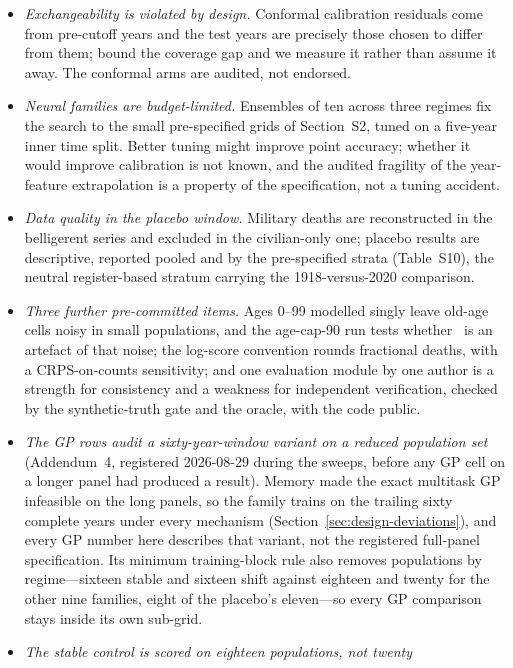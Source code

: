 \begin{itemize}
\item \emph{Exchangeability is violated by design.} Conformal calibration
  residuals come from pre-cutoff years and the test years are precisely those
  chosen to differ from them; \citet{barber2023conformal} bound the coverage
  gap and we measure it rather than assume it away. The conformal arms are
  audited, not endorsed.
\item \emph{Neural families are budget-limited.} Ensembles of ten across three
  regimes fix the search to the small pre-specified grids of Section~S2, tuned
  on a five-year inner time split. Better tuning might improve point accuracy;
  whether it would improve calibration is not known, and the audited fragility
  of the year-feature extrapolation is a property of the specification, not a
  tuning accident.
\item \emph{Data quality in the placebo window.} Military deaths are
  reconstructed in the belligerent series and excluded in the civilian-only
  one; placebo results are descriptive, reported pooled and by the
  pre-specified strata (Table~S10), the neutral register-based stratum carrying
  the 1918-versus-2020 comparison.
\item \emph{Three further pre-committed items.} Ages 0--99 modelled singly
  leave old-age cells noisy in small populations, and the age-cap-90 run tests
  whether \Hfour\ is an artefact of that noise; the log-score convention rounds
  fractional deaths, with a CRPS-on-counts sensitivity; and one evaluation
  module by one author is a strength for consistency and a weakness for
  independent verification, checked by the synthetic-truth gate and the
   oracle, with the code public.
\item \emph{The GP rows audit a sixty-year-window variant on a reduced
  population set} (Addendum~4, registered 2026-08-29 during the sweeps, before
  any GP cell on a longer panel had produced a result). Memory made the exact
  multitask GP infeasible on the long panels, so the family trains on the
  trailing sixty complete years under every mechanism
  (Section~\ref{sec:design-deviations}), and every GP number here describes
  that variant, not the registered full-panel specification. Its minimum
  training-block rule also removes populations by regime---sixteen stable and
  sixteen shift against eighteen and twenty for the other nine families, eight
  of the placebo's eleven---so every GP comparison stays inside its own
  sub-grid.
\item \emph{The stable control is scored on eighteen populations, not twenty}

\end{itemize}
